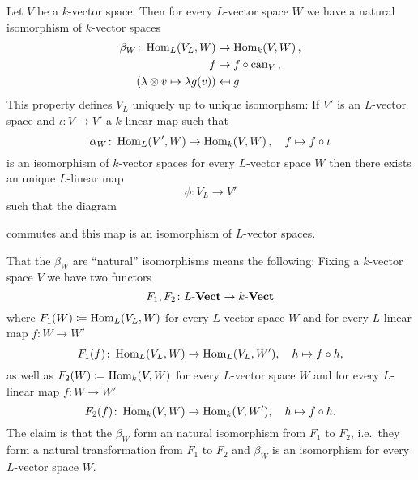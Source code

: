 \begin{theorem}
  Let $V$ be a $k$-vector space. Then for every $L$-vector space $W$ we have a natural isomorphism of $k$-vector spaces
  \begin{align*}
              \beta_W
    \colon    \operatorname{Hom}_L(V_L, W)
    &\to      \operatorname{Hom}_k(V,W) \,, \\
              f
    &\mapsto  f \circ \operatorname{can}_V \,,  \\
              ( \lambda \otimes v \mapsto \lambda g(v) )
    &\mapsfrom g
  \end{align*}
  This property defines $V_L$ uniquely up to unique isomorphsm:
  If $V'$ is an $L$-vector space and $\iota \colon V \to V'$ a $k$-linear map such that
  \[
            \alpha_W
    \colon  \operatorname{Hom}_L(V', W)
    \to     \operatorname{Hom}_k(V,W) \,,
    \quad   f
    \mapsto f \circ \iota
  \]
  is an isomorphism of $k$-vector spaces for every $L$-vector space $W$ then there exists an unique $L$-linear map
  \[
    \phi \colon V_L \to V'
  \]
  such that the diagram
  \begin{center}
  \end{center}
  commutes and this map is an isomorphism of $L$-vector spaces.
\end{theorem}


That the $\beta_W$ are ``natural'' isomorphisms means the following:
Fixing a $k$-vector space $V$ we have two functors
\[
          F_1, F_2
  \colon  L\text{-}\mathbf{Vect}
  \to     k\text{-}\mathbf{Vect}
\]
where $F_1(W) \coloneqq \operatorname{Hom}_L(V_L,W)$ for every $L$-vector space $W$ and for every $L$-linear map $f \colon W \to W'$
\[
          F_1(f)
  \colon  \operatorname{Hom}_L(V_L, W)
  \to     \operatorname{Hom}_L(V_L, W'),
  \quad   h
  \mapsto f \circ h,
\]
as well as $F_2(W) \coloneqq \operatorname{Hom}_k(V,W)$ for every $L$-vector space $W$ and for every $L$-linear map $f \colon W \to W'$
\[
          F_2(f)
  \colon  \operatorname{Hom}_k(V,W)
  \to     \operatorname{Hom}_k(V,W'),
  \quad   h
  \mapsto f \circ h.
\]
The claim is that the $\beta_W$ form an natural isomorphism from $F_1$ to $F_2$, i.e.\ they form a natural transformation from $F_1$ to $F_2$ and $\beta_W$ is an isomorphism for every $L$-vector space $W$.


